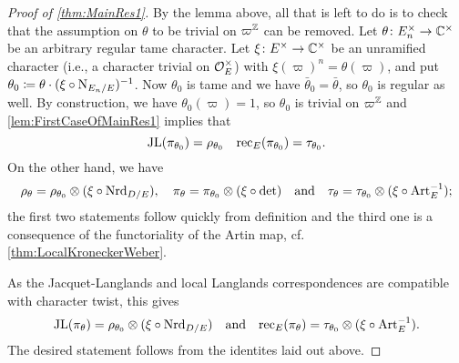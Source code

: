 \documentclass[../main.tex]{subfiles}
\begin{document}
\begin{proof}[Proof of \cref{thm:MainRes1}]
  By the lemma above, all that is left to do is to check that the 
  assumption on $\theta$ to be trivial on $\varpi^{\mathbb{Z}}$ can be removed.   
  Let $\theta\colon E_n^\times \to \mathbb{C}^\times$ be an arbitrary regular
  tame character. Let $\xi\colon E^\times \to \mathbb{C}^\times$ be an unramified character 
  (i.e., a character trivial on $\mathcal{O}_E^\times$) with $\xi(\varpi)^n =
  \theta(\varpi)$, and put $\theta_0 \coloneqq \theta \cdot (\xi \circ
  \operatorname{N}_{E_n/E})^{-1}$. Now $\theta_0$ is tame and we have $\bar \theta_0 =
  \bar \theta$, so $\theta_0$ is regular as well. By construction, we have
  $\theta_0(\varpi) = 1$, so $\theta_0$ is trivial on $\varpi^{\mathbb{Z}}$ and
  \cref{lem:FirstCaseOfMainRes1} implies that 
  $$\mathrm{JL}(\pi_{\theta_0}) = \rho_{\theta_0} \quad \mathrm{rec}_E(\pi_{\theta_0}) =
  \tau_{\theta_0}.$$
  On the other hand, we have
  \begin{equation*}
    \rho_{\theta} = \rho_{\theta_0} \otimes (\xi \circ \operatorname{Nrd}_{D/E}),
      \quad 
    \pi_{\theta} = \pi_{\theta_0} \otimes (\xi \circ \det)
      \quad \text{and} \quad
    \tau_{\theta} = \tau_{\theta_0} \otimes (\xi \circ \operatorname{Art}_E^{-1});
  \end{equation*}
  the first two statements follow quickly from definition and the third one
  is a consequence of the functoriality of the Artin map, cf.
  \cref{thm:LocalKroneckerWeber}.
  
  As the Jacquet-Langlands and local Langlands correspondences are compatible
  with character twist, this gives
  \begin{equation*}
    \mathrm{JL}(\pi_\theta) = \rho_{\theta_0} \otimes (\xi \circ \operatorname{Nrd}_{D/E}) 
    \quad \text{and} \quad
    \mathrm{rec}_E(\pi_{\theta}) = \tau_{\theta_0} \otimes (\xi \circ \operatorname{Art}_E^{-1}).
  \end{equation*}
  The desired statement follows from the identites laid out above.
\end{proof}

\end{document}
